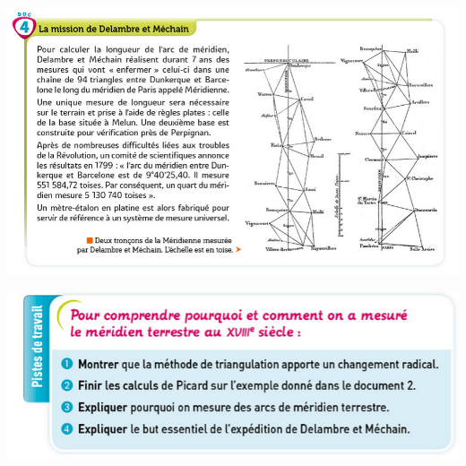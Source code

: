 \documentclass[10pt]{article}
\newcommand{\myscale}{0.57}
\begin{document}
\begin{center}
	\includegraphics[scale=\myscale]{assets/d4.png}

	\includegraphics[scale=\myscale]{assets/q.png}
\end{center}



\end{document}
